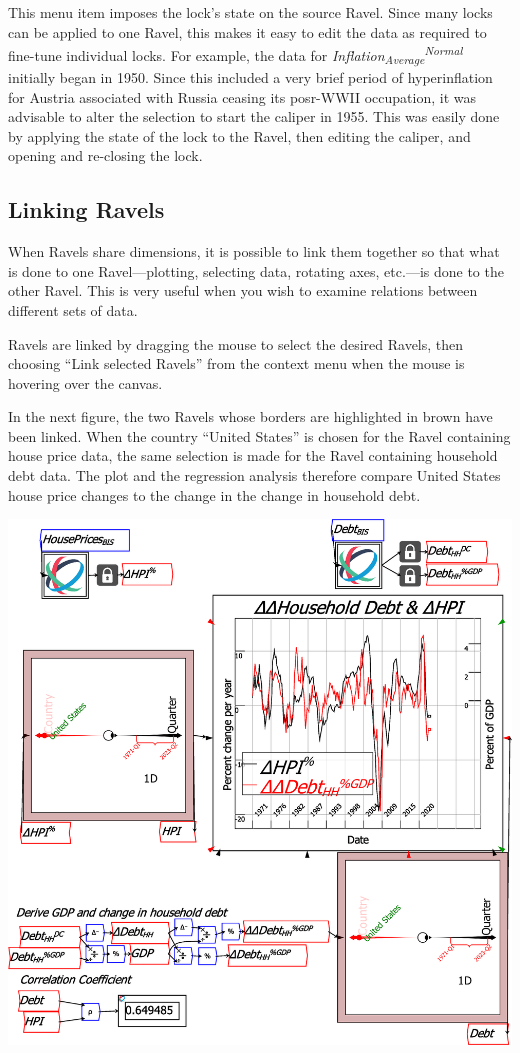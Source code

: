 This menu item imposes the lock's state on the source Ravel. Since
many locks can be applied to one Ravel, this makes it easy to edit
the data as required to fine-tune individual locks. For example, the
data for \emph{Inflation}\textsubscript{\emph{Average}}\emph{}\textsuperscript{\emph{Normal}}
initially began in 1950. Since this included a very brief period of
hyperinflation for Austria associated with Russia ceasing its posr-WWII
occupation, it was advisable to alter the selection to start the caliper
in 1955. This was easily done by applying the state of the lock to
the Ravel, then editing the caliper, and opening and re-closing the
lock.

\subsection{Linking Ravels \label{Linking-Ravels}}

When Ravels share dimensions, it is possible to link them together
so that what is done to one Ravel---plotting, selecting data, rotating
axes, etc.---is done to the other Ravel. This is very useful when
you wish to examine relations between different sets of data.

Ravels are linked by dragging the mouse to select the desired Ravels,
then choosing ``Link selected Ravels'' from the context menu when
the mouse is hovering over the canvas.

In the next figure, the two Ravels whose borders are highlighted in
brown have been linked. When the country ``United States'' is chosen
for the Ravel containing house price data, the same selection is made
for the Ravel containing household debt data. The plot and the regression
analysis therefore compare United States house price changes to the
change in the change in household debt.

\noindent\includegraphics[width=\textwidth]{images/RavelLinking}


